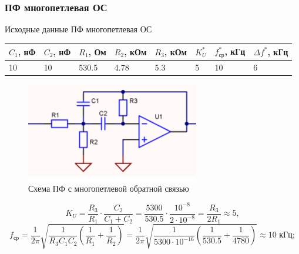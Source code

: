 \documentclass[a4paper, 12pt]{article}
\begin{document}
    \subsubsection{ПФ многопетлевая ОС} \label{sec:strip_multi}
    Исходные данные ПФ многопетлевая ОС
    \begin{center}
        \begin{tabular}{ | m{3.5em} | m{3.5em}| m{3.5em} | m{4em} | m{4em} | m{2.5em} | m{4em} | m{4.5em} |} 
        \hline
        $C_1$, нФ&$C_2$, нФ&$R_1$, Ом&$R_2$, кОм&$R_3$, кОм&$K_U^*$&$f_\text{ср}^*$, кГц &$\Delta f^*$, кГц\\ 
        \hline
        10&10&530.5&4.78&5.3&5&10&6\\ 
        \hline
        \end{tabular}
    \end{center}
    \begin{figure}[H]
        \centering
        \includegraphics[scale=0.9]{strip_multi.png}
        \captionsetup{skip=0pt}
        \caption{Схема ПФ с многопетлевой обратной связью}
        \label{fig:null_scheme4}
    \end{figure}
    $$
    K_U=\dfrac{R_3}{R_1}\cdot\dfrac{C_2}{C_1+C_2}=\dfrac{5300}{530.5}\cdot\dfrac{10^{-8}}{2\cdot10^{-8}}=\dfrac{R_3}{2R_1}\approx5,
    $$
    $$
    f_\text{ср}=\dfrac{1}{2\pi}\sqrt{\dfrac{1}{R_3C_1C_2}\left( \dfrac{1}{R_1}+\dfrac{1}{R_2} \right)}=\dfrac{1}{2\pi}\sqrt{\dfrac{1}{5300\cdot10^{-16}}\left( \dfrac{1}{530.5}+\dfrac{1}{4780} \right)}\approx10\text{ кГц};
    $$
\end{document}
